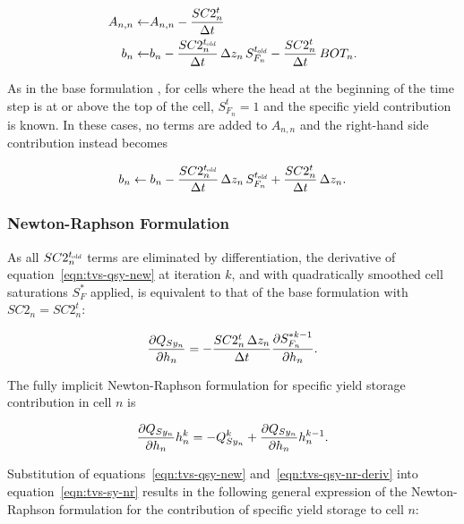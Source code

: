 \begin{equation}
	\label{eqn:tvs-sy-Ab-std}
	\begin{aligned}
		A_{n,n} \leftarrow & A_{n,n} - \frac{SC2_n^t}{\Delta t} \\
		b_n \leftarrow & b_n - \frac{SC2_n^{t_\mathit{\kern -0.07em old}}}{\Delta t} \, \Delta z_n \, S_{F_n}^{t_\mathit{\kern -0.07em old}} - \frac{SC2_n^t}{\Delta t} \, BOT_n .
	\end{aligned}
\end{equation}

\noindent As in the base formulation \citep[Chapter 5]{modflow6gwf}, for cells where the head at the beginning of the time step is at or above the top of the cell, $S_{F_n}^t = 1$ and the specific yield contribution is known. In these cases, no terms are added to $A_{n,n}$ and the right-hand side contribution instead becomes

\begin{equation}
	\label{eqn:tvs-sy-b-fullsat}
	b_n \leftarrow b_n - \frac{SC2_n^{t_\mathit{\kern -0.07em old}}}{\Delta t} \, \Delta z_n \, S_{F_n}^{t_\mathit{\kern -0.07em old}} + \frac{SC2_n^t}{\Delta t} \, \Delta z_n .
\end{equation}


\subsubsection{Newton-Raphson Formulation}

As all $SC2_n^{t_\mathit{\kern -0.07em old}}$ terms are eliminated by differentiation, the derivative of equation~\ref{eqn:tvs-qsy-new} at iteration $k$, and with quadratically smoothed cell saturations $S_F^*$ applied, is equivalent to that of the base formulation \citep[eq. 5--14]{modflow6gwf} with $SC2_n = SC2_n^t$:

\begin{equation}
	\label{eqn:tvs-qsy-nr-deriv}
	\frac{\partial Q_{Sy_n}}{\partial h_n} = - \frac{SC2_n^t \, \Delta z_n}{\Delta t} \frac{\partial S_{F_n}^{\ast k-1}}{\partial h_n} .
\end{equation}

\noindent The fully implicit Newton-Raphson formulation for specific yield storage contribution in cell $n$ is

\begin{equation}
	\label{eqn:tvs-sy-nr}
	\frac{\partial Q_{Sy_n}}{\partial h_n} h_n^k = -Q_{Sy_n}^k + \frac{\partial Q_{Sy_n}}{\partial h_n} h_n^{k-1} .
\end{equation}

\noindent Substitution of equations~\ref{eqn:tvs-qsy-new} and~\ref{eqn:tvs-qsy-nr-deriv} into equation~\ref{eqn:tvs-sy-nr} results in the following general expression of the Newton-Raphson formulation for the contribution of specific yield storage to cell $n$:


